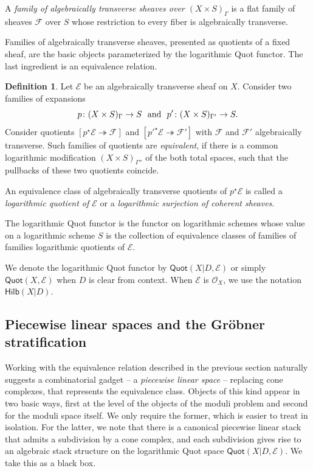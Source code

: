 \documentclass[11pt]{amsart}
\theoremstyle{definition}
\theoremstyle{definition}
\newtheorem{definition}[theorem]{Definition}
\begin{document}
A {\it family of algebraically transverse sheaves over $(X\times S)_\Gamma$} is a flat family of sheaves $\mathcal F$ over $S$ whose restriction to every fiber is algebraically transverse. 

Families of algebraically transverse sheaves, presented as quotients of a fixed sheaf, are the basic objects parameterized by the logarithmic Quot functor. The last ingredient is an equivalence relation. 

\begin{definition}\label{def: quot-equivalence}
Let $\mathcal E$ be an algebraically transverse sheaf on $X$. Consider two families of expansions
\[
p\colon (X\times S)_\Gamma\to S \ \ \textnormal{and} \ \ p'\colon (X\times S)_{\Gamma'}\to S.
\] 
Consider quotients $[p^\star \mathcal E\twoheadrightarrow \mathcal F]$ and $[{p'}^\star\mathcal E\twoheadrightarrow \mathcal F']$ with $\mathcal F$ and $\mathcal F'$ algebraically transverse. Such families of quotients are {\it equivalent}, if there is a common logarithmic modification $(X\times S)_{\Gamma''}$ of the both total spaces, such that the pullbacks of these two quotients coincide. 
\end{definition}

An equivalence class of algebraically transverse quotients of $p^\star\mathcal E$ is called a {\it logarithmic quotient of $\mathcal E$} or a {\it logarithmic surjection of coherent sheaves}. 

The logarithmic Quot functor is the functor on logarithmic schemes whose value on a logarithmic scheme $S$ is the collection of equivalence classes of families of families logarithmic quotients of $\mathcal E$. 

We denote the logarithmic Quot functor by $\mathsf{Quot}(X|D,\mathcal E)$ or simply $\mathsf{Quot}(X,\mathcal E)$ when $D$ is clear from context. When $\mathcal E$ is $\mathcal O_X$, we use the notation $\mathsf{Hilb}(X|D)$. 

\subsection{Piecewise linear spaces and the Gr\"obner stratification}\label{sec: pl-G-strat}

Working with the equivalence relation described in the previous section naturally suggests a combinatorial gadget -- a {\it piecewise linear space} -- replacing cone complexes, that represents the equivalence class. Objects of this kind appear in two basic ways, first at the level of the objects of the moduli problem and second for the moduli space itself. We only require the former, which is easier to treat in isolation. For the latter, we note that there is a canonical piecewise linear stack that admits a subdivision by a cone complex, and each subdivision gives rise to an algebraic stack structure on the logarithmic Quot space $\mathsf{Quot}(X|D,\mathcal E)$. We take this as a black box. 
\end{document}
